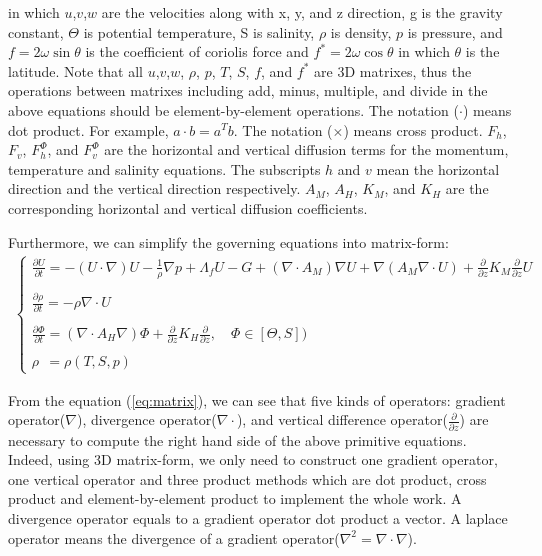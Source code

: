 \documentclass[oribibl]{llncs}
\begin{document}
in which $u$,$v$,$w$ are the velocities along with x, y, and z direction,  g is the gravity constant,  $\Theta$ is potential temperature,  S is salinity, $\rho$ is density, $p$ is pressure, and $f=2\omega \sin \theta$ is the coefficient of coriolis force and $f^*=2\omega \cos \theta$ in which $\theta$ is the latitude. Note that all $u$,$v$,$w$, $\rho$, $p$, $T$, $S$, $f$, and $f^*$ are 3D matrixes, thus the operations between matrixes including add, minus, multiple, and divide in the above equations should be  element-by-element operations. The notation ($\cdot$) means dot product. For example, $a\cdot b=a^Tb$. The notation ($\times$) means cross product.  $F_h$, $F_v$, $F_h^\Phi$, and $F_v^\Phi$ are the horizontal and vertical diffusion terms for the momentum, temperature and salinity equations. The subscripts $h$ and $v$ mean the horizontal direction and the vertical direction respectively. $A_M$, $A_H$, $K_M$, and $K_H$ are the corresponding horizontal and vertical diffusion coefficients.

Furthermore, we can simplify the governing equations into matrix-form:
\begin{eqnarray}\label{eq:matrix}
\left \{
\begin{array}{l}  
\frac{\partial U}{\partial t} = - (U \cdot  \nabla){U}  - \frac{1}{\rho} \nabla {p} +\Lambda_f U - G +  (\nabla \cdot  A_M) \nabla U + \nabla(A_M \nabla \cdot U)+ \frac{\partial }{\partial z} K_M  \frac{\partial }{\partial z}U  \\   \\ 
\frac{\partial \rho}{\partial t} = - \rho \nabla \cdot U  \\  \\ 
\frac{\partial {\Phi}}{\partial t}= (\nabla \cdot A_H   \nabla) \Phi   + \frac{\partial }{\partial z} K_H  \frac{\partial }{\partial z}, \quad \Phi  \in [\Theta,S])  \\  \\ 
\rho \ \ = \rho(T,S,p) 
\end{array}
\right.
\end{eqnarray}

From the equation (\ref{eq:matrix}), we can see that five kinds of operators: gradient operator($\nabla$), divergence operator($\nabla \cdot$), and vertical difference operator($\frac{\partial}{\partial z}$)  are necessary to compute the right hand side of the above primitive equations. Indeed, using 3D matrix-form, we only need to construct one gradient operator, one  vertical operator and three product methods which are dot product, cross product and element-by-element product to implement the whole work. A divergence operator equals to a gradient operator dot product a vector. A  laplace operator means the divergence of a gradient operator($\nabla^2=\nabla \cdot \nabla$). 
\end{document}

